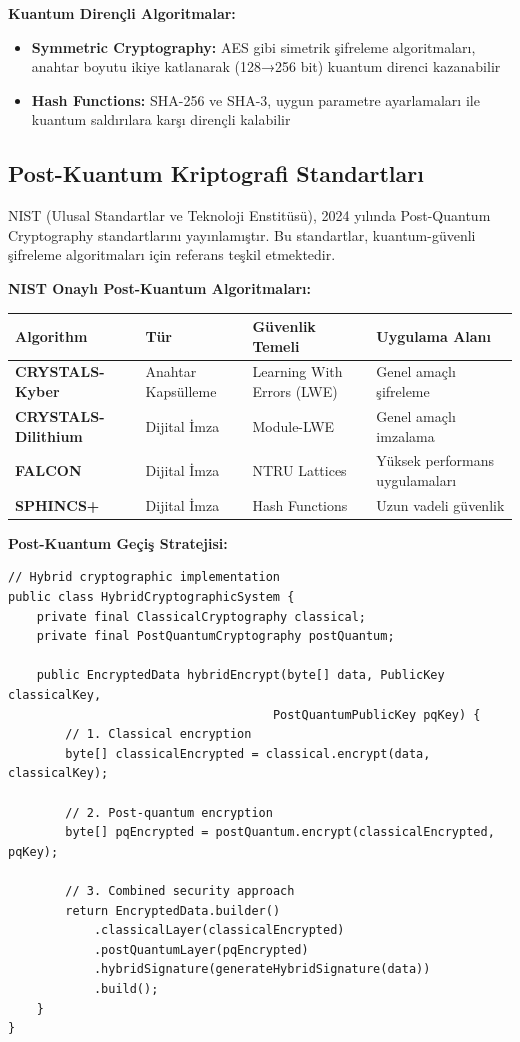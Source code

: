 \textbf{Kuantum Dirençli Algoritmalar:}
\begin{itemize}
    \item \textbf{Symmetric Cryptography:} AES gibi simetrik şifreleme algoritmaları, anahtar boyutu ikiye katlanarak (128→256 bit) kuantum direnci kazanabilir
    \item \textbf{Hash Functions:} SHA-256 ve SHA-3, uygun parametre ayarlamaları ile kuantum saldırılara karşı dirençli kalabilir
\end{itemize}

\subsection{Post-Kuantum Kriptografi Standartları}

NIST (Ulusal Standartlar ve Teknoloji Enstitüsü), 2024 yılında Post-Quantum Cryptography standartlarını yayınlamıştır. Bu standartlar, kuantum-güvenli şifreleme algoritmaları için referans teşkil etmektedir.

\textbf{NIST Onaylı Post-Kuantum Algoritmaları:}

\begin{adjustbox}{max width=\textwidth}
\begin{tabularx}{\textwidth}{|l|X|X|X|}
\hline
\textbf{Algorithm} & \textbf{Tür} & \textbf{Güvenlik Temeli} & \textbf{Uygulama Alanı} \\
\hline
\textbf{CRYSTALS-Kyber} & Anahtar Kapsülleme & Learning With Errors (LWE) & Genel amaçlı şifreleme \\
\hline
\textbf{CRYSTALS-Dilithium} & Dijital İmza & Module-LWE & Genel amaçlı imzalama \\
\hline
\textbf{FALCON} & Dijital İmza & NTRU Lattices & Yüksek performans uygulamaları \\
\hline
\textbf{SPHINCS+} & Dijital İmza & Hash Functions & Uzun vadeli güvenlik \\
\hline
\end{tabularx}
\end{adjustbox}

\textbf{Post-Kuantum Geçiş Stratejisi:}
\begin{lstlisting}[breaklines=true,basicstyle=\ttfamily\footnotesize]
// Hybrid cryptographic implementation
public class HybridCryptographicSystem {
    private final ClassicalCryptography classical;
    private final PostQuantumCryptography postQuantum;
    
    public EncryptedData hybridEncrypt(byte[] data, PublicKey classicalKey, 
                                     PostQuantumPublicKey pqKey) {
        // 1. Classical encryption
        byte[] classicalEncrypted = classical.encrypt(data, classicalKey);
        
        // 2. Post-quantum encryption  
        byte[] pqEncrypted = postQuantum.encrypt(classicalEncrypted, pqKey);
        
        // 3. Combined security approach
        return EncryptedData.builder()
            .classicalLayer(classicalEncrypted)
            .postQuantumLayer(pqEncrypted)
            .hybridSignature(generateHybridSignature(data))
            .build();
    }
}
\end{lstlisting}

